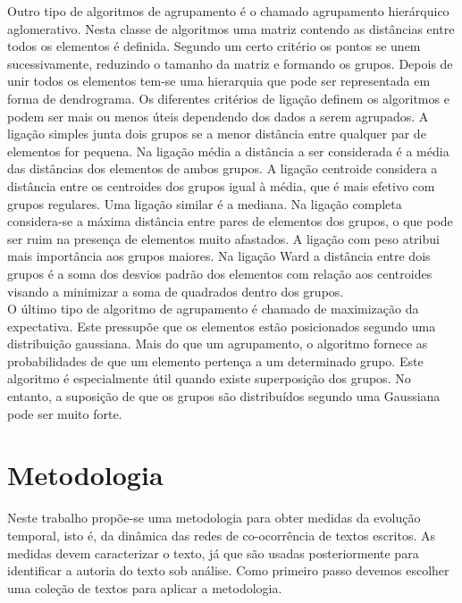 \documentclass[a4paper,openright,12pt]{report} %
\begin{document}
Outro tipo de algoritmos de agrupamento \'e o chamado agrupamento hier\'arquico aglomerativo. Nesta classe de algoritmos uma matriz contendo as dist\^ancias entre todos os elementos \'e definida. Segundo um certo crit\'erio os pontos se unem sucessivamente, reduzindo o tamanho da matriz e formando os grupos. Depois de unir todos os elementos tem-se uma hierarquia que pode ser representada em forma de dendrograma. Os diferentes crit\'erios de liga\c c\~ao definem os algoritmos e podem ser mais ou menos \'uteis dependendo dos dados a serem agrupados. A liga\c c\~ao simples junta dois grupos se a menor dist\^ancia entre qualquer par de elementos for pequena. Na liga\c c\~ao m\'edia a dist\^ancia a ser considerada \'e a m\'edia das dist\^ancias dos elementos de ambos grupos. A liga\c c\~ao centroide considera a dist\^ancia entre os centroides dos grupos igual \`a m\'edia, que \'e mais efetivo com grupos regulares. Uma liga\c c\~ao similar \'e a mediana. Na liga\c c\~ao completa considera-se a m\'axima dist\^ancia entre pares de elementos dos grupos, o que pode ser ruim na presen\c ca de elementos muito afastados. A liga\c c\~ao com peso atribui mais import\^ancia aos grupos maiores. Na liga\c c\~ao Ward a dist\^ancia entre dois grupos \'e a soma dos desvios padr\~ao dos elementos com rela\c c\~ao aos centroides visando a minimizar a soma de quadrados dentro dos grupos.\\

O \'ultimo tipo de algoritmo de agrupamento \'e chamado de maximiza\c c\~ao da expectativa. Este pressup\~oe que os elementos est\~ao posicionados segundo uma distribui\c c\~ao gaussiana. Mais do que um agrupamento, o algoritmo fornece as probabilidades de que um elemento perten\c ca a um determinado grupo. Este algoritmo \'e especialmente \'util quando existe superposi\c c\~ao dos grupos. No entanto, a suposição de que os grupos s\~ao distribu\'idos segundo uma Gaussiana pode ser muito forte.\\





\chapter{Metodologia}

Neste trabalho prop\~oe-se uma metodologia para obter medidas da evolu\c c\~ao temporal, isto \'e, da din\^amica das redes de co-ocorr\^encia de textos escritos. As medidas devem caracterizar o texto, j\'a que s\~ao usadas posteriormente para identificar a autoria do texto sob an\'alise. Como primeiro passo devemos escolher uma cole\c c\~ao de textos para aplicar a metodologia.
\end{document}
